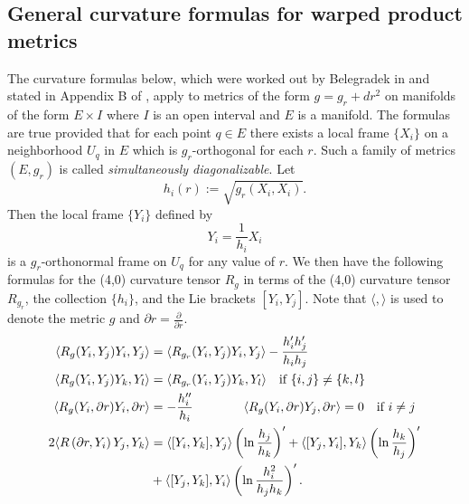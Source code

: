 \documentclass[10pt]{amsart}
\def\la{\langle}
\def\ra{\rangle}
\def\ddr{\frac{\partial}{\partial r}}
\def\dr{\partial r}
\theoremstyle{definition}
\theoremstyle{remark}
\numberwithin{equation}{section}
\begin{document}
	
	
\subsection{General curvature formulas for warped product metrics}\label{subsection:product formulas}
The curvature formulas below, which were worked out by Belegradek in \cite{Belegradek real} and stated in Appendix B of \cite{Belegradek complex}, apply to metrics of the form $g = g_r + dr^2$ on manifolds of the form $E \times I $ where $I$ is an open interval and $E$ is a manifold.  
The formulas are true provided that for each point $q \in E$ there exists a local frame $\{ X_i \}$ on a neighborhood $U_q$ in $E$ which is $g_r$-orthogonal for each $r$.  
Such a family of metrics $(E, g_r)$ is called {\it simultaneously diagonalizable}.  
Let
	\begin{equation*}
	h_i(r) := \sqrt{g_r(X_i,X_i)}.
	\end{equation*}
Then the local frame $\{ Y_i \}$ defined by
	\begin{equation*}
	Y_i = \frac{1}{h_i} X_i
	\end{equation*}
is a $g_r$-orthonormal frame on $U_q$ for any value of $r$.  
We then have the following formulas for the (4,0) curvature tensor $R_g$ in terms of the (4,0) curvature tensor $R_{g_r}$, the collection $\{ h_i \}$, and the Lie brackets $[Y_i,Y_j]$.  
Note that $\la , \ra$ is used to denote the metric $g$ and $\dr = \ddr$.
	\begin{align}
	\la R_g(Y_i,Y_j)Y_i, Y_j \ra &= \la R_{g_r} (Y_i,Y_j)Y_i,Y_j \ra - \frac{h_i' h_j'}{h_i h_j}  \label{eqn:Bel 1}  \\
	\la R_g(Y_i,Y_j)Y_k, Y_l \ra &= \la R_{g_r} (Y_i, Y_j)Y_k, Y_l \ra  \hskip 10pt \text{if } \{i, j \} \neq \{ k, l \}  \label{eqn:Bel 2}  \\
	\la R_g (Y_i, \dr) Y_i, \dr \ra &= - \frac{h_i''}{h_i}  \hskip 40pt \la R_g(Y_i, \dr)Y_j, \dr \ra = 0 \hskip 10pt \text{if } i \neq j  \label{eqn:Bel 3}  \\
	2\la R \left( \dr, Y_i \right) Y_j, Y_k \ra &=  \la [Y_i,Y_k],Y_j \ra \left( \ln \frac{h_j}{h_k} \right)' + \la [Y_j,Y_i],Y_k \ra \left( \ln \frac{h_k}{h_j} \right)'  \label{eqn:Bel 4}  \\
	&+ \la [Y_j,Y_k],Y_i \ra \left( \ln \frac{h_i^2}{h_j h_k} \right)'   \nonumber .
	\end{align}
	
	
	
\end{document}
